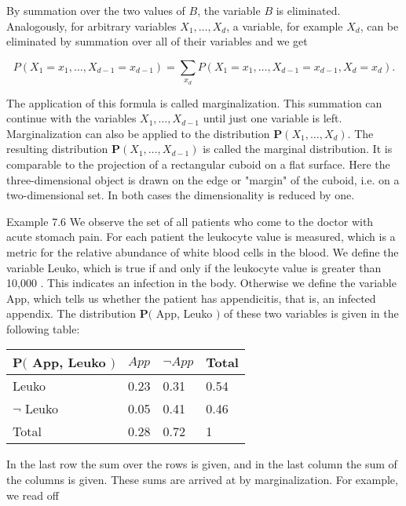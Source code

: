 \documentclass[10pt]{article}
\begin{document}
By summation over the two values of $B$, the variable $B$ is eliminated. Analogously, for arbitrary variables $X_{1}, \ldots, X_{d}$, a variable, for example $X_{d}$, can be eliminated by summation over all of their variables and we get

$$
P\left(X_{1}=x_{1}, \ldots, X_{d-1}=x_{d-1}\right)=\sum_{x_{d}} P\left(X_{1}=x_{1}, \ldots, X_{d-1}=x_{d-1}, X_{d}=x_{d}\right) .
$$

The application of this formula is called marginalization. This summation can continue with the variables $X_{1}, \ldots, X_{d-1}$ until just one variable is left. Marginalization can also be applied to the distribution $\boldsymbol{P}\left(X_{1}, \ldots, X_{d}\right)$. The resulting distribution $\boldsymbol{P}\left(X_{1}, \ldots, X_{d-1}\right)$ is called the marginal distribution. It is comparable to the projection of a rectangular cuboid on a flat surface. Here the three-dimensional object is drawn on the edge or "margin" of the cuboid, i.e. on a two-dimensional set. In both cases the dimensionality is reduced by one.

Example 7.6 We observe the set of all patients who come to the doctor with acute stomach pain. For each patient the leukocyte value is measured, which is a metric for the relative abundance of white blood cells in the blood. We define the variable Leuko, which is true if and only if the leukocyte value is greater than 10,000 . This indicates an infection in the body. Otherwise we define the variable App, which tells us whether the patient has appendicitis, that is, an infected appendix. The distribution $\boldsymbol{P}($ App, Leuko $)$ of these two variables is given in the following table:

\begin{center}
\begin{tabular}{llll}
\hline
$\boldsymbol{P}($ App, Leuko $)$ & $A p p$ & $\neg A p p$ & Total \\
\hline
Leuko & 0.23 & 0.31 & 0.54 \\
\hline
$\neg$ Leuko & 0.05 & 0.41 & 0.46 \\
\hline
Total & 0.28 & 0.72 & 1 \\
\hline
\end{tabular}
\end{center}

In the last row the sum over the rows is given, and in the last column the sum of the columns is given. These sums are arrived at by marginalization. For example, we read off
\end{document}
